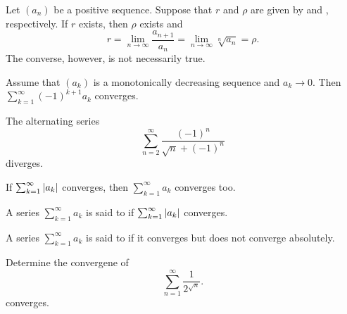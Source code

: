 \begin{proposition}
  Let $(a_n)$ be a positive sequence. Suppose that $r$ and $\rho$ are
  given by  and , respectively.
  If $r$ exists, then $\rho$ exists and
  \[ r = \lim_{n \to \infty} \frac{a_{n + 1}}{a_n} = \lim_{n \to
  \infty} \sqrt[n]{a_n} = \rho. \]
  The converse, however, is not necessarily true.
\end{proposition}

\begin{proposition}
  Assume that $(a_k)$ is a monotonically decreasing sequence and $a_k
  \to 0$. Then $\sum_{k = 1}^{\infty} (-1)^{k + 1} a_k$ converges.
\end{proposition}

\begin{example}
  The alternating series
  \[ \sum_{n = 2}^{\infty} \frac{(-1)^n}{\sqrt{n} + (-1)^n} \]
  diverges.
\end{example}

\begin{proposition}
  If $\sum_{k = 1}^{\infty} | a_k |$ converges, then $\sum_{k =
  1}^{\infty} a_k$ converges too.
\end{proposition}

\begin{definition}
  A series $\sum_{k = 1}^{\infty} a_k$ is said to  if $\sum_{k = 1}^{\infty} | a_k |$ converges.
\end{definition}

\begin{definition}
  A series $\sum_{k = 1}^{\infty} a_k$ is said to  if it converges but does not converge absolutely.
\end{definition}

\begin{example}
  Determine the convergene of
  \[ \sum_{n = 1}^{\infty} \frac{1}{2^{\sqrt{n}}}. \]
  converges.
\end{example}

